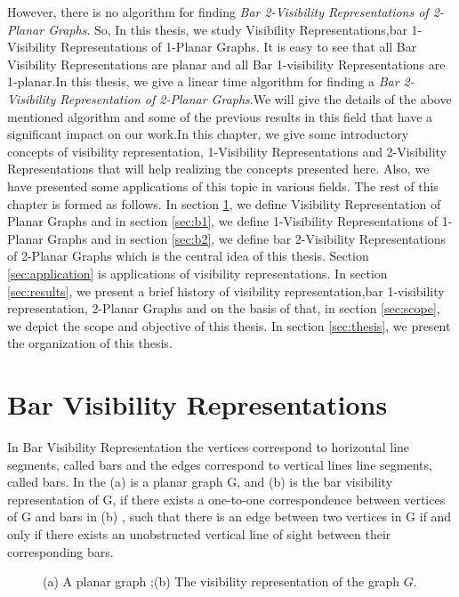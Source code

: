 However, there is no algorithm for finding \emph{Bar 2-Visibility Representations of 2-Planar Graphs}. So, In this thesis, we study Visibility Representations,bar 1-Visibility Representations of 1-Planar Graphs. It is easy to see that all Bar Visibility Representations are planar and all Bar 1-visibility Representations are 1-planar.In this thesis, we give a linear time algorithm for finding a \emph{ Bar 2-Visibility Representation of 2-Planar Graphs}.We will give the details of the above mentioned algorithm and some of the previous results in this field that have a significant impact on our work.In this chapter, we give some introductory concepts of visibility representation, 1-Visibility Representations and 2-Visibility Representations that will help realizing the concepts presented here. Also, we have presented some applications of this topic in various fields. The rest of this chapter is formed as follows. In section \ref{sec:bbr}, we define Visibility Representation of Planar Graphs and in section \ref{sec:b1}, we define 1-Visibility Representations of 1-Planar Graphs and  in section \ref{sec:b2}, we define bar 2-Visibility Representations of 2-Planar Graphs which is the central idea of this thesis. Section \ref{sec:application} is applications of visibility representations. In section \ref{sec:results}, we present a brief history of visibility representation,bar 1-visibility representation, 2-Planar Graphs and on the basis of that, in section \ref{sec:scope}, we depict the scope and objective of this thesis. In section  \ref{sec:thesis}, we present the organization of this thesis.









\section{Bar Visibility Representations}
\label{sec:bbr}
In Bar Visibility Representation \cite{R} the vertices correspond to horizontal line segments, called bars and the edges correspond to vertical lines line segments, called bars.
In the  (a) is a planar graph G, and (b) is the bar visibility representation of G, if there exists a one-to-one correspondence between vertices of G and bars in (b) , such that there is an edge between two vertices in G if and only if there exists an unobstructed vertical line of sight between their corresponding bars. 

\begin{figure}[!tb]
  \centering
\resizebox{150mm}{!}{}
\caption{(a) A planar graph ;(b) The visibility representation of the graph $G$.}
\label{fig:v}
\end{figure}



